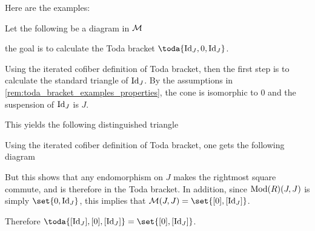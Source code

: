 Here are the examples:

\begin{example}
	Let the following be a diagram in \( {\mathcal{M}} \)
	\begin{center}
	\end{center}
	the goal is to calculate the Toda bracket \( \toda{\Id_J, 0, \Id_J} \).

	Using the iterated cofiber definition of Toda bracket, then the first step is to calculate the standard triangle of \( \operatorname{Id}_J \). By the assumptions in \autoref{rem:toda_bracket_examples_properties}, the cone is isomorphic to \( 0 \) and the suspension of \( \operatorname{Id}_J \) is \( J \).

	This yields the following distinguished triangle
	\begin{center}
	\end{center}

	Using the iterated cofiber definition of Toda bracket, one gets the following diagram
	\begin{center}
	\end{center}

	But this shows that any endomorphism on \( J \) makes the rightmost square commute, and is therefore in the Toda bracket. In addition, since \( \operatorname{Mod}(R)(J, J) \) is simply \( \set{0, \Id_J} \), this implies that \( \Mc(J, J) = \set{[0], [\Id_J]} \).

	Therefore \( \toda{[\Id_J], [0], [\Id_J]} = \set{[0], [\Id_J]} \). 
\end{example}


